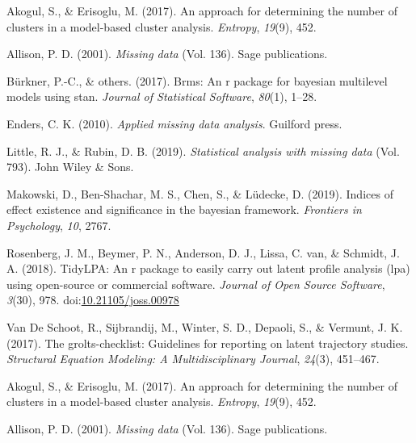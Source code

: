 \documentclass[man]{apa6}
\begin{document}
\begingroup
\setlength{\parindent}{-0.5in}
\setlength{\leftskip}{0.5in}

\hypertarget{refs}{}
\leavevmode\hypertarget{ref-akogul2017approach}{}%
Akogul, S., \& Erisoglu, M. (2017). An approach for determining the number of clusters in a model-based cluster analysis. \emph{Entropy}, \emph{19}(9), 452.

\leavevmode\hypertarget{ref-allison2001missing}{}%
Allison, P. D. (2001). \emph{Missing data} (Vol. 136). Sage publications.

\leavevmode\hypertarget{ref-burkner2017}{}%
Bürkner, P.-C., \& others. (2017). Brms: An r package for bayesian multilevel models using stan. \emph{Journal of Statistical Software}, \emph{80}(1), 1--28.

\leavevmode\hypertarget{ref-enders2010applied}{}%
Enders, C. K. (2010). \emph{Applied missing data analysis}. Guilford press.

\leavevmode\hypertarget{ref-little2019statistical}{}%
Little, R. J., \& Rubin, D. B. (2019). \emph{Statistical analysis with missing data} (Vol. 793). John Wiley \& Sons.

\leavevmode\hypertarget{ref-makowski2019}{}%
Makowski, D., Ben-Shachar, M. S., Chen, S., \& Lüdecke, D. (2019). Indices of effect existence and significance in the bayesian framework. \emph{Frontiers in Psychology}, \emph{10}, 2767.

\leavevmode\hypertarget{ref-R-tidyLPA}{}%
Rosenberg, J. M., Beymer, P. N., Anderson, D. J., Lissa, C. van, \& Schmidt, J. A. (2018). TidyLPA: An r package to easily carry out latent profile analysis (lpa) using open-source or commercial software. \emph{Journal of Open Source Software}, \emph{3}(30), 978. doi:\href{https://doi.org/10.21105/joss.00978}{10.21105/joss.00978}

\leavevmode\hypertarget{ref-van2017grolts}{}%
Van De Schoot, R., Sijbrandij, M., Winter, S. D., Depaoli, S., \& Vermunt, J. K. (2017). The grolts-checklist: Guidelines for reporting on latent trajectory studies. \emph{Structural Equation Modeling: A Multidisciplinary Journal}, \emph{24}(3), 451--467.

\leavevmode\hypertarget{ref-akogul2017approach}{}%
Akogul, S., \& Erisoglu, M. (2017). An approach for determining the number of clusters in a model-based cluster analysis. \emph{Entropy}, \emph{19}(9), 452.

\leavevmode\hypertarget{ref-allison2001missing}{}%
Allison, P. D. (2001). \emph{Missing data} (Vol. 136). Sage publications.
\end{document}
